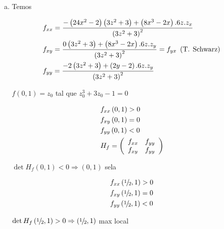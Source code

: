 \documentclass{book}
\begin{document}
\begin{enumerate}
\begin{sol}
\begin{enumerate}[(a)]
    \item Temos

\[
\begin{gathered}
  f_{xx}  = \frac{{ - \left( {24x^2  - 2} \right)\left( {3z^2  + 3} \right) + \left( {8x^3  - 2x} \right).6z.z_x }}
{{\left( {3z^2  + 3} \right)^2 }} \hfill \\
  f_{xy}  = \frac{{0\left( {3z^2  + 3} \right) + \left( {8x^3  - 2x} \right).6z.z_y }}
{{\left( {3z^2  + 3} \right)^2 }} = f_{yx} {\text{ }}\left( {{\text{T}}{\text{. Schwarz}}} \right) \hfill \\
  f_{yy}  = \frac{{ - 2\left( {3z^2  + 3} \right) + \left( {2y - 2} \right).6z.z_y }}
{{\left( {3z^2  + 3} \right)^2 }} \hfill \\
\end{gathered}
\]

$f(0,1)=z_0$ tal que $z_0^3  + 3z_0  - 1 = 0$

\[
\begin{gathered}
  f_{xx} \left( {0,1} \right) > 0 \hfill \\
  f_{xy} \left( {0,1} \right) = 0 \hfill \\
  f_{yy} \left( {0,1} \right) < 0 \hfill \\
  H_f  = \left( {\begin{array}{*{20}c}
   {f_{xx} } & {f_{yy} }  \\
   {f_{xy} } & {f_{yy} }  \\

 \end{array} } \right) \hfill \\
\end{gathered}
\]

$\det H_f \left( {0,1} \right) < 0 \Rightarrow \left( {0,1} \right)$ sela

\[
\begin{gathered}
  f_{xx} \left( {{\raise0.5ex\hbox{$\scriptstyle 1$}
\kern-0.1em/\kern-0.15em
\lower0.25ex\hbox{$\scriptstyle 2$}},1} \right) > 0 \hfill \\
  f_{xy} \left( {{\raise0.5ex\hbox{$\scriptstyle 1$}
\kern-0.1em/\kern-0.15em
\lower0.25ex\hbox{$\scriptstyle 2$}},1} \right) = 0 \hfill \\
  f_{yy} \left( {{\raise0.5ex\hbox{$\scriptstyle 1$}
\kern-0.1em/\kern-0.15em
\lower0.25ex\hbox{$\scriptstyle 2$}},1} \right) < 0 \hfill \\
\end{gathered}
\]

$\det H_f \left( {{\raise0.5ex\hbox{$\scriptstyle 1$}
\kern-0.1em/\kern-0.15em
\lower0.25ex\hbox{$\scriptstyle 2$}},1} \right) > 0 \Rightarrow \left( {{\raise0.5ex\hbox{$\scriptstyle 1$}
\kern-0.1em/\kern-0.15em
\lower0.25ex\hbox{$\scriptstyle 2$}},1} \right)$ max local


\end{enumerate}
\end{sol}
\end{enumerate}
\end{document}
